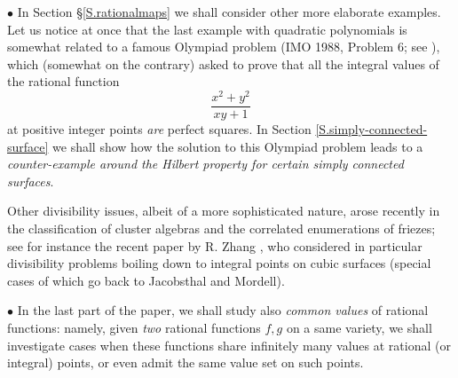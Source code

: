 \documentclass[leqno,12pt]{article} %
\def\A{{{\mathbb A}}}
\def\Q{{{\mathbb Q}}}
\theoremstyle{plain} %
\theoremstyle{definition} %
\begin{document}
 
$\bullet$ In Section \S \ref{S.rationalmaps} we shall consider other more elaborate examples. Let us notice at once that the last example with quadratic polynomials  is somewhat related  to a famous Olympiad problem (IMO 1988, Problem 6; see \cite{DJMP}), which (somewhat on the contrary) asked to  prove that all the integral values of the rational function
$$
\frac{x^2+y^2}{xy+1}
$$
at positive integer points {\it are} perfect squares. In Section \ref{S.simply-connected-surface} we shall show how the solution to this Olympiad problem leads to a {\it counter-example around the Hilbert property for certain simply connected surfaces}. 

\smallskip

Other divisibility issues, albeit of a more sophisticated nature, arose recently in the classification of cluster algebras and the correlated enumerations of friezes; see for instance the recent paper by  {\sc R. Zhang} \cite{Zh}, who considered in particular divisibility problems boiling down to integral points on cubic surfaces (special cases of which go back to {\sc Jacobsthal} and {\sc Mordell}). 

\smallskip


 

\smallskip


$\bullet$  In the last part of the paper, we shall study also {\it common values} of rational functions: namely, given {\it two} rational functions $f,g$ on a same variety, we shall investigate cases when  these functions share infinitely many values at rational (or integral) points, or even admit the same value set on such points. 
 
\end{document}
